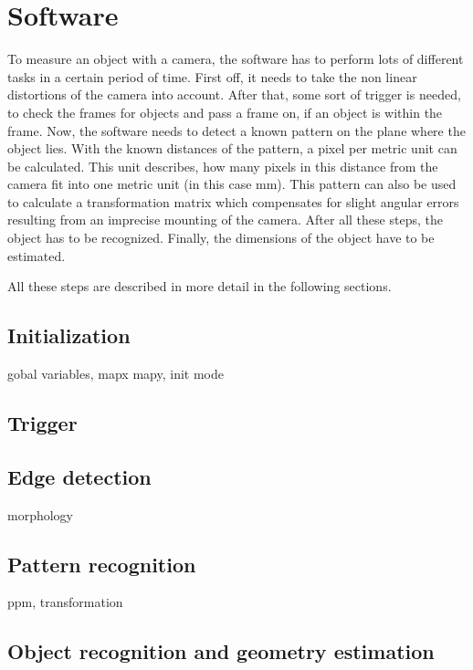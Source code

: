 \section{Software}
To measure an object with a camera, the software has to perform lots of different tasks in a certain period of time.
First off, it needs to take the non linear distortions of the camera into account.
After that, some sort of trigger is needed, to check the frames for objects and pass a frame on, if an object is within the frame.
Now, the software needs to detect a known pattern on the plane where the object lies.
With the known distances of the pattern, a pixel per metric unit can be calculated.
This unit describes, how many pixels in this distance from the camera fit into one metric unit (in this case mm).
This pattern can also be used to calculate a transformation matrix which compensates for slight angular errors resulting from an imprecise mounting of the camera.
After all these steps, the object has to be recognized.
Finally, the dimensions of the object have to be estimated.

All these steps are described in more detail in the following sections.


\subsection{Initialization}
gobal variables, mapx mapy, init mode

\subsection{Trigger}

\subsection{Edge detection}
morphology

\subsection{Pattern recognition}
ppm, transformation

\subsection{Object recognition and geometry estimation}
